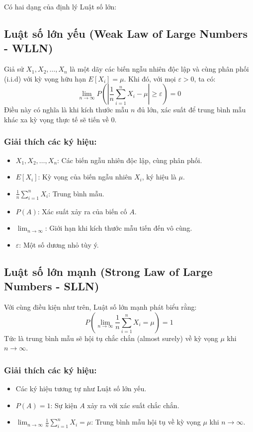 Có hai dạng của định lý Luật số lớn:

\subsection{Luật số lớn yếu (Weak Law of Large Numbers - WLLN)}
Giả sử $X_1, X_2, \dots, X_n$ là một dãy các biến ngẫu nhiên độc lập và cùng phân phối (i.i.d) với kỳ vọng hữu hạn $E[X_i] = \mu$. Khi đó, với mọi $\varepsilon > 0$, ta có:
\begin{equation}
\lim_{n \to \infty} P\left( \left| \frac{1}{n} \sum_{i=1}^{n} X_i - \mu \right| \geq \varepsilon \right) = 0
\end{equation}
Điều này có nghĩa là khi kích thước mẫu $n$ đủ lớn, xác suất để trung bình mẫu khác xa kỳ vọng thực tế sẽ tiến về 0.

\subsubsection*{Giải thích các ký hiệu:}
\begin{itemize}
    \item $X_1, X_2, \dots, X_n$: Các biến ngẫu nhiên độc lập, cùng phân phối.
    \item $E[X_i]$: Kỳ vọng của biến ngẫu nhiên $X_i$, ký hiệu là $\mu$.
    \item $\frac{1}{n} \sum_{i=1}^{n} X_i$: Trung bình mẫu.
    \item $P(A)$: Xác suất xảy ra của biến cố $A$.
    \item $\lim_{n \to \infty}$: Giới hạn khi kích thước mẫu tiến đến vô cùng.
    \item $\varepsilon$: Một số dương nhỏ tùy ý.
\end{itemize}

\subsection{Luật số lớn mạnh (Strong Law of Large Numbers - SLLN)}
Với cùng điều kiện như trên, Luật số lớn mạnh phát biểu rằng:
\begin{equation}
P\left( \lim_{n \to \infty} \frac{1}{n} \sum_{i=1}^{n} X_i = \mu \right) = 1
\end{equation}
Tức là trung bình mẫu sẽ hội tụ chắc chắn (almost surely) về kỳ vọng $\mu$ khi $n \to \infty$.

\subsubsection*{Giải thích các ký hiệu:}
\begin{itemize}
    \item Các ký hiệu tương tự như Luật số lớn yếu.
    \item $P(A) = 1$: Sự kiện $A$ xảy ra với xác suất chắc chắn.
    \item $\lim_{n \to \infty} \frac{1}{n} \sum_{i=1}^{n} X_i = \mu$: Trung bình mẫu hội tụ về kỳ vọng $\mu$ khi $n \to \infty$.
\end{itemize}

